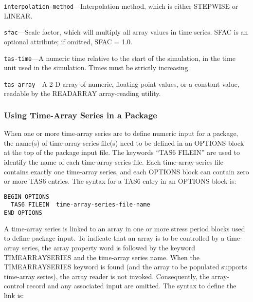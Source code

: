 \begin{description}
\item \texttt{interpolation-method}---Interpolation method, which is either STEPWISE or LINEAR.
\end{description}

\begin{description}
\item \texttt{sfac}---Scale factor, which will multiply all array values in time series. SFAC is an optional attribute; if omitted, SFAC = 1.0.
\end{description}

\begin{description}
\item \texttt{tas-time}---A numeric time relative to the start of the simulation, in the time unit used in the simulation. Times must be strictly increasing.
\end{description}

\begin{description}
\item \texttt{tas-array}---A 2-D array of numeric, floating-point values, or a constant value, readable by the READARRAY array-reading utility.
\end{description}

\subsubsection{Using Time-Array Series in a Package}
When one or more time-array series are to define numeric input for a package, the name(s) of time-array-series file(s) need to be defined in an OPTIONS block at the top of the package input file. The keywords ``TAS6 FILEIN'' are used to identify the name of each time-array-series file. Each time-array-series file contains exactly one time-array series, and each OPTIONS block can contain zero or more TAS6 entries. The syntax for a TAS6 entry in an OPTIONS block is:

\begin{lstlisting}[style=blockdefinition]
BEGIN OPTIONS
  TAS6 FILEIN  time-array-series-file-name
END OPTIONS
\end{lstlisting}

A time-array series is linked to an array in one or more stress period blocks used to define package input. To indicate that an array is to be controlled by a time-array series, the array property word is followed by the keyword TIMEARRAYSERIES and the time-array series name. When the TIMEARRAYSERIES keyword is found (and the array to be populated supports time-array series), the array reader is not invoked. Consequently, the array-control record and any associated input are omitted. The syntax to define the link is:

